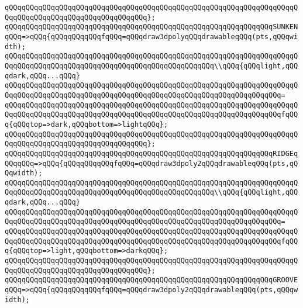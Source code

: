 \verb|qQQqqQQqqQQqqQQqqQQqqQQqqQQqqQQqqQQqqQQqqQQqqQQqqQQqqQQqqQQqqQQqqQQqqQQqqQQqqQQqqQQqqQQqqQQqqQQqqQQqqQQq};|\newline
\newline
\verb|qQQqqQQqqQQqqQQqqQQqqQQqqQQqqQQqqQQqqQQqqQQqqQQqqQQqqQQqqQQqqQQqSUNKENqQQq=>qQQq{qQQqqQQqqQQqfqQQq=qQQqdraw3dpolyqQQqdrawableqQQq(pts,qQQqwidth);|\newline
\newline
\verb|qQQqqQQqqQQqqQQqqQQqqQQqqQQqqQQqqQQqqQQqqQQqqQQqqQQqqQQqqQQqqQQqqQQqqQQqqQQqqQQqqQQqqQQqqQQqqQQqqQQqqQQqqQQqqQQqqQQqqQQq\\qQQq{qQQqlight,qQQqdark,qQQq...qQQq}|\newline
\verb|qQQqqQQqqQQqqQQqqQQqqQQqqQQqqQQqqQQqqQQqqQQqqQQqqQQqqQQqqQQqqQQqqQQqqQQqqQQqqQQqqQQqqQQqqQQqqQQqqQQqqQQqqQQqqQQqqQQqqQQqqQQqqQQqqQQqqQQq=|\newline
\verb|qQQqqQQqqQQqqQQqqQQqqQQqqQQqqQQqqQQqqQQqqQQqqQQqqQQqqQQqqQQqqQQqqQQqqQQqqQQqqQQqqQQqqQQqqQQqqQQqqQQqqQQqqQQqqQQqqQQqqQQqqQQqqQQqqQQqqQQqfqQQq{qQQqtop=>dark,qQQqbottom=>lightqQQq};|\newline
\verb|qQQqqQQqqQQqqQQqqQQqqQQqqQQqqQQqqQQqqQQqqQQqqQQqqQQqqQQqqQQqqQQqqQQqqQQqqQQqqQQqqQQqqQQqqQQqqQQqqQQqqQQq};|\newline
\newline
\verb|qQQqqQQqqQQqqQQqqQQqqQQqqQQqqQQqqQQqqQQqqQQqqQQqqQQqqQQqqQQqqQQqRIDGEqQQqqQQq=>qQQq{qQQqqQQqqQQqfqQQq=qQQqdraw3dpoly2qQQqdrawableqQQq(pts,qQQqwidth);|\newline
\newline
\verb|qQQqqQQqqQQqqQQqqQQqqQQqqQQqqQQqqQQqqQQqqQQqqQQqqQQqqQQqqQQqqQQqqQQqqQQqqQQqqQQqqQQqqQQqqQQqqQQqqQQqqQQqqQQqqQQqqQQqqQQq\\qQQq{qQQqlight,qQQqdark,qQQq...qQQq}|\newline
\verb|qQQqqQQqqQQqqQQqqQQqqQQqqQQqqQQqqQQqqQQqqQQqqQQqqQQqqQQqqQQqqQQqqQQqqQQqqQQqqQQqqQQqqQQqqQQqqQQqqQQqqQQqqQQqqQQqqQQqqQQqqQQqqQQqqQQqqQQq=|\newline
\verb|qQQqqQQqqQQqqQQqqQQqqQQqqQQqqQQqqQQqqQQqqQQqqQQqqQQqqQQqqQQqqQQqqQQqqQQqqQQqqQQqqQQqqQQqqQQqqQQqqQQqqQQqqQQqqQQqqQQqqQQqqQQqqQQqqQQqqQQqfqQQq{qQQqtop=>light,qQQqbottom=>darkqQQq};|\newline
\verb|qQQqqQQqqQQqqQQqqQQqqQQqqQQqqQQqqQQqqQQqqQQqqQQqqQQqqQQqqQQqqQQqqQQqqQQqqQQqqQQqqQQqqQQqqQQqqQQqqQQqqQQq};|\newline
\newline
\verb|qQQqqQQqqQQqqQQqqQQqqQQqqQQqqQQqqQQqqQQqqQQqqQQqqQQqqQQqqQQqqQQqGROOVEqQQq=>qQQq{qQQqqQQqqQQqfqQQq=qQQqdraw3dpoly2qQQqdrawableqQQq(pts,qQQqwidth);|\newline
